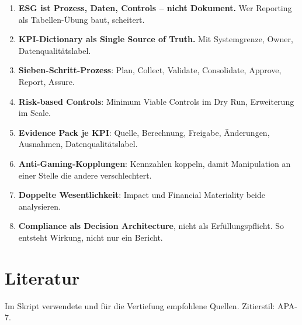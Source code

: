 \documentclass[11pt,a4paper,oneside]{article}
\begin{document}
\begin{enumerate}
  \item \textbf{ESG ist Prozess, Daten, Controls -- nicht Dokument.} Wer Reporting als Tabellen-Übung baut, scheitert.
  \item \textbf{KPI-Dictionary als Single Source of Truth.} Mit Systemgrenze, Owner, Datenqualitätslabel.
  \item \textbf{Sieben-Schritt-Prozess}: Plan, Collect, Validate, Consolidate, Approve, Report, Assure.
  \item \textbf{Risk-based Controls}: Minimum Viable Controls im Dry Run, Erweiterung im Scale.
  \item \textbf{Evidence Pack je KPI}: Quelle, Berechnung, Freigabe, Änderungen, Ausnahmen, Datenqualitätslabel.
  \item \textbf{Anti-Gaming-Kopplungen}: Kennzahlen koppeln, damit Manipulation an einer Stelle die andere verschlechtert.
  \item \textbf{Doppelte Wesentlichkeit}: Impact und Financial Materiality beide analysieren.
  \item \textbf{Compliance als Decision Architecture}, nicht als Erfüllungspflicht. So entsteht Wirkung, nicht nur ein Bericht.
\end{enumerate}

\clearpage
\section{Literatur}

Im Skript verwendete und für die Vertiefung empfohlene Quellen. Zitierstil: APA-7.
\end{document}
